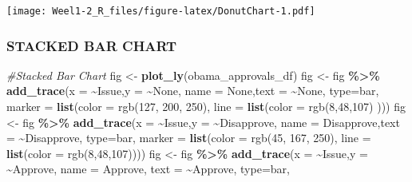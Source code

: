 \documentclass[
]{article}
\newenvironment{Shaded}{\begin{snugshade}}{\end{snugshade}}
\newcommand{\AttributeTok}[1]{\textcolor[rgb]{0.13,0.29,0.53}{#1}}
\newcommand{\CommentTok}[1]{\textcolor[rgb]{0.56,0.35,0.01}{\textit{#1}}}
\newcommand{\FunctionTok}[1]{\textcolor[rgb]{0.13,0.29,0.53}{\textbf{#1}}}
\newcommand{\NormalTok}[1]{#1}
\newcommand{\OtherTok}[1]{\textcolor[rgb]{0.56,0.35,0.01}{#1}}
\newcommand{\SpecialCharTok}[1]{\textcolor[rgb]{0.81,0.36,0.00}{\textbf{#1}}}
\newcommand{\StringTok}[1]{\textcolor[rgb]{0.31,0.60,0.02}{#1}}
\begin{document}
\texttt{[image: Weel1-2\_R\_files/figure-latex/DonutChart-1.pdf]}

\hypertarget{stacked-bar-chart}{%
\subsubsection{STACKED BAR CHART}\label{stacked-bar-chart}}

\begin{Shaded}
\begin{Highlighting}[]
\CommentTok{\#Stacked Bar Chart}
\NormalTok{fig }\OtherTok{\textless{}{-}} \FunctionTok{plot\_ly}\NormalTok{(obama\_approvals\_df)}
\NormalTok{fig }\OtherTok{\textless{}{-}}\NormalTok{ fig }\SpecialCharTok{\%\textgreater{}\%} \FunctionTok{add\_trace}\NormalTok{(}\AttributeTok{x =} \SpecialCharTok{\textasciitilde{}}\NormalTok{Issue,}\AttributeTok{y =} \SpecialCharTok{\textasciitilde{}}\NormalTok{None, }\AttributeTok{name =} \StringTok{\textquotesingle{}None\textquotesingle{}}\NormalTok{,}\AttributeTok{text =} \SpecialCharTok{\textasciitilde{}}\NormalTok{None, }\AttributeTok{type=}\StringTok{\textquotesingle{}bar\textquotesingle{}}\NormalTok{,}
                         \AttributeTok{marker =} \FunctionTok{list}\NormalTok{(}\AttributeTok{color =} \StringTok{\textquotesingle{}rgb(127, 200, 250)\textquotesingle{}}\NormalTok{,}
                                       \AttributeTok{line =} \FunctionTok{list}\NormalTok{(}\AttributeTok{color =} \StringTok{\textquotesingle{}rgb(8,48,107)\textquotesingle{}}\NormalTok{ )))}
\NormalTok{fig }\OtherTok{\textless{}{-}}\NormalTok{ fig }\SpecialCharTok{\%\textgreater{}\%} \FunctionTok{add\_trace}\NormalTok{(}\AttributeTok{x =} \SpecialCharTok{\textasciitilde{}}\NormalTok{Issue,}\AttributeTok{y =} \SpecialCharTok{\textasciitilde{}}\NormalTok{Disapprove, }\AttributeTok{name =} \StringTok{\textquotesingle{}Disapprove\textquotesingle{}}\NormalTok{,}\AttributeTok{text =} \SpecialCharTok{\textasciitilde{}}\NormalTok{Disapprove, }\AttributeTok{type=}\StringTok{\textquotesingle{}bar\textquotesingle{}}\NormalTok{,}
                         \AttributeTok{marker =} \FunctionTok{list}\NormalTok{(}\AttributeTok{color =} \StringTok{\textquotesingle{}rgb(45, 167, 250)\textquotesingle{}}\NormalTok{,}
                                       \AttributeTok{line =} \FunctionTok{list}\NormalTok{(}\AttributeTok{color =} \StringTok{\textquotesingle{}rgb(8,48,107)\textquotesingle{}}\NormalTok{)))}
\NormalTok{fig }\OtherTok{\textless{}{-}}\NormalTok{ fig }\SpecialCharTok{\%\textgreater{}\%} \FunctionTok{add\_trace}\NormalTok{(}\AttributeTok{x =} \SpecialCharTok{\textasciitilde{}}\NormalTok{Issue,}\AttributeTok{y =} \SpecialCharTok{\textasciitilde{}}\NormalTok{Approve, }\AttributeTok{name =} \StringTok{\textquotesingle{}Approve\textquotesingle{}}\NormalTok{, }\AttributeTok{text =} \SpecialCharTok{\textasciitilde{}}\NormalTok{Approve, }\AttributeTok{type=}\StringTok{\textquotesingle{}bar\textquotesingle{}}\NormalTok{,}

\end{Highlighting}
\end{Shaded}
\end{document}
